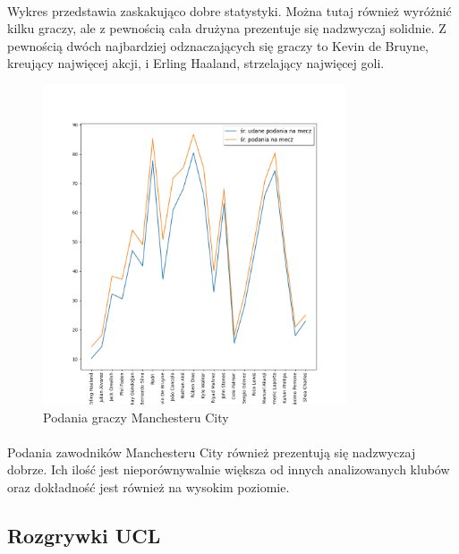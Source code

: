 \documentclass[12pt, letterpaper]{article}
\begin{document}
\paragraph{} Wykres przedstawia zaskakująco dobre statystyki. Można tutaj również wyróżnić kilku graczy, ale z pewnością cała drużyna prezentuje się nadzwyczaj solidnie. Z pewnością dwóch najbardziej odznaczających się graczy to Kevin de Bruyne, kreujący najwięcej akcji, i Erling Haaland, strzelający najwięcej goli.
\pagebreak
\begin{figure}[ht]
    \centering
    \includegraphics[width=0.8\textwidth]{images/Manchester_passes.png}
    \caption{Podania graczy Manchesteru City}
    \label{fig:enter-label}
\end{figure}
\paragraph{} Podania zawodników Manchesteru City również prezentują się nadzwyczaj dobrze. Ich ilość jest nieporównywalnie większa od innych analizowanych klubów oraz dokładność jest również na wysokim poziomie.
\pagebreak

\subsection{Rozgrywki UCL}
\end{document}

